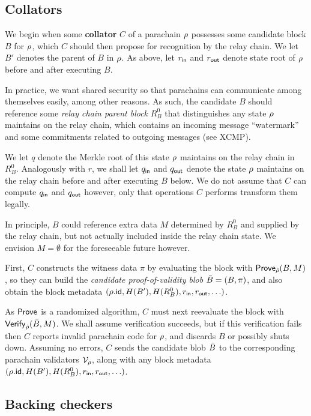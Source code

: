 \subsection{Collators} 
\label{sec:collators}

We begin when some {\bf collator} $C$ of a parachain $\rho$ possesses some candidate block $B$ for $\rho$, which $C$ should then propose for recognition by the relay chain.  We let $B'$ denotes the parent of $B$ in $\rho$.  As above, let $r_{\mathsf{in}}$ and $r_{\mathsf{out}}$ denote state root of $\rho$ before and after executing $B$.  

In practice, we want shared security so that parachains can communicate among themselves easily, among other reasons.  As such, the candidate $B$ should reference some {\em relay chain parent block} $R^0_B$ that distinguishes any state $\rho$ maintains on the relay chain, which contains an incoming message ``watermark'' and some commitments related to outgoing messages (see XCMP). 

We let $q$ denote the Merkle root of this state $\rho$ maintains on the relay chain in $R^0_B$.  Analogously with $r$, we shall let $q_{\mathsf{in}}$ and $q_{\mathsf{out}}$ denote the state $\rho$ maintains on the relay chain before and after executing $B$ below.  We do not assume that $C$ can compute $q_{\mathsf{in}}$ and $q_{\mathsf{out}}$ however, only that operations $C$ performs transform them legally.

In principle, $B$ could reference extra data $M$ determined by $R^0_B$ and supplied by the relay chain, but not actually included inside the relay chain state.  We envision $M = \emptyset$ for the foreseeable future however. 

First, $C$ constructs the witness data $\pi$ by evaluating the block with $\mathsf{Prove}_{\hat{\rho}}(B,M)$, so they can build the {\em candidate proof-of-validity blob} $\bar{B} = (B,\pi)$, and also obtain the block metadata $(\rho.\mathsf{id},H(B'),H(R^0_B),r_{\mathsf{in}},r_{\mathsf{out}},\ldots)$.  

As $\mathsf{Prove}$ is a randomized algorithm, $C$ must next reevaluate the block with $\mathsf{Verify}_{\hat{\rho}}(\bar{B},M)$.  We shall assume verification succeeds, but if this verification fails then $C$ reports invalid parachain code for $\rho$, and discards $B$ or possibly shuts down.  Assuming no errors, $C$ sends the candidate blob $\bar{B}$ to the corresponding parachain validators $\mathcal{V}_{\rho}$, along with any block metadata $(\rho.\mathsf{id},H(B'),H(R^0_B),r_{\mathsf{in}},r_{\mathsf{out}},\ldots)$. 


\subsection{Backing checkers} %
\label{sec:backing_checks}

